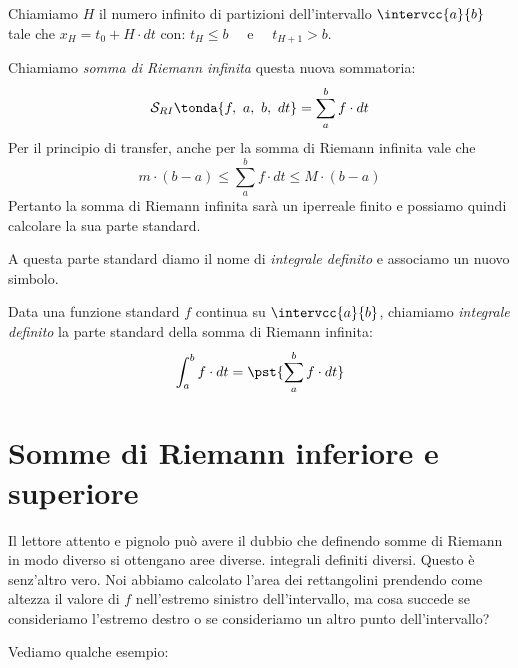 Chiamiamo \(H\) il numero infinito di partizioni dell'intervallo 
\(\intervcc{a}{b}\) tale che \(x_H = t_0 + H \cdot dt\) con: \quad 
\(t_H \le b\) ~~e~~ \(t_{H+1} > b\).

Chiamiamo \emph{somma di Riemann infinita} questa nuova sommatoria:
\[\mathcal{S}_{RI} \tonda{f,~a,~b,~dt} = \sum_a^b f \cdot dt\]
Per il principio di transfer, anche per la somma di Riemann infinita vale 
che 
\[m \cdot (b - a) \le  \sum_a^b f \cdot dt  \le M\cdot(b - a)\]
Pertanto la somma di Riemann infinita sarà un iperreale finito e 
possiamo quindi calcolare la sua parte standard. 

A questa parte standard diamo il nome di \emph{integrale definito} e
associamo un nuovo simbolo.
\begin{newdef}{}{}
Data una funzione standard \(f\) continua su \(\intervcc{a}{b}\),
chiamiamo \emph{integrale definito} la parte standard della 
somma di Riemann infinita:
\[\int_a^b f \cdot dt = \pst{\sum_a^b f \cdot dt}\]
\end{newdef}


\section{Somme di Riemann inferiore e superiore}
\label{sec:integrali_somme_riemann}

% 
Il lettore attento e pignolo può avere il dubbio che definendo somme di 
Riemann in modo diverso si ottengano 
aree diverse.
integrali definiti diversi. 
Questo è senz'altro vero.
Noi abbiamo calcolato l'area dei rettangolini prendendo come altezza il 
valore di \(f\) nell'estremo sinistro dell'intervallo, ma cosa succede se 
consideriamo l'estremo destro o se consideriamo un altro punto 
dell'intervallo?

Vediamo qualche esempio:
% 

